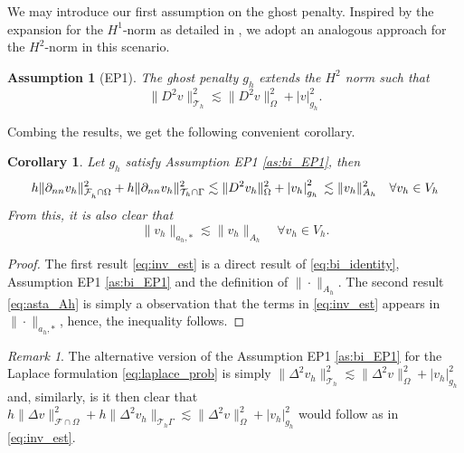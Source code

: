 \documentclass[11pt]{article}
\newtheorem*{assumption*}{Assumption} %
\newtheorem{corollary}[theorem]{Corollary}
\theoremstyle{remark}
\newtheorem*{remark}{Remark}
\newcommand{\abs}[1]{\left\lvert #1 \right\rvert}
\numberwithin{equation}{section}
\begin{document}
We may introduce our first assumption on the ghost penalty.  Inspired by the expansion for the $H^{1}$-norm as detailed in \cite[Equation 2.23]{gurkan2019stabilized}, we adopt an analogous approach for the $H^{2}$-norm in this scenario.
\begin{assumption*}[EP1]
    The ghost penalty $g_{h}$ extends the $H^{2}$ norm such that
    \begin{equation}
    \label{as:bi_EP1}
    \| D^2 v \|_{ \mathcal{T} _{h} }^{ 2 } \lesssim  \| D^2 v \|_{ \Omega  }^{ 2 } + \abs{ v } _{g_{h}}^{2}.
    \end{equation}
\end{assumption*}


Combing the results, we get the following convenient corollary.

\begin{corollary}
    \label{cor:bi_inverse_thm}
    Let  $g_{h}$ satisfy Assumption EP1 \eqref{as:bi_EP1}, then
    \begin{equation}
        \label{eq:inv_est}
            h\| \partial _{nn}  v_{h} \|_{ \mathcal{F}_h^{} \cap \Omega    }^{2 } + h\| \partial _{nn} v_{h} \|_{ \mathcal{T} _{h} \cap \Gamma  }^{2  }   \lesssim  \| D^2 v_{h} \|_{ \Omega  }^{ 2 } + \abs{ v_{h} } _{g_{h}}^{2} \\
              \lesssim \| v_{h} \|_{ A_{h} }^{  2} \quad  \forall v_{h} \in V_{h}
    \end{equation}
    From this, it is also clear that \begin{equation}
        \label{eq:asta_Ah}
    \| v_{h} \|_{ a_{h},* }^{  }  \lesssim \| v_{h} \|_{ A_{h} }^{  } \quad  \forall v_{h} \in V_{h}.
    \end{equation}
\end{corollary}
\begin{proof}
    The first result \eqref{eq:inv_est} is a direct result of \eqref{eq:bi_identity}, Assumption EP1 \eqref{as:bi_EP1} and the definition of $\| \cdot  \|_{ A_{h} }^{  } $.
    The second result \eqref{eq:asta_Ah} is simply a observation that the terms in \eqref{eq:inv_est} appears in $\| \cdot   \|_{a_{h},*  }^{  } $, hence, the inequality follows.
\end{proof}

\begin{remark}
    The alternative version of the Assumption EP1 \eqref{as:bi_EP1} for the Laplace formulation \eqref{eq:laplace_prob} is simply $\| \Delta ^2 v_{h} \|_{ \mathcal{T} _{h} }^{ 2 } \lesssim  \| \Delta ^2 v \|_{\Omega   }^{2  } + \abs{ v_{h} } _{g_{h}} ^{2}
    $ and, similarly, is it then clear that $ h \| \Delta v  \|_{\mathcal{F} \cap \Omega   }^{ 2 } +h \| \Delta^2 v_{h}  \|_{\mathcal{T} _{h} \Gamma   }^{  } \lesssim  \| \Delta ^2 v \|_{\Omega   }^{2  } + \abs{ v_{h} } _{g_{h}} ^{2} $ would follow  as in
    \eqref{eq:inv_est}.

\end{remark}
\end{document}
